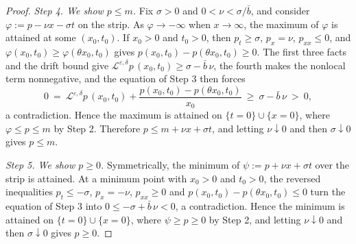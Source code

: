 \documentclass[12pt]{amsart}
\numberwithin{equation}{section}
\theoremstyle{plain}
\theoremstyle{definition}
\newcommand{\eps}{\varepsilon}
\newcommand{\Lop}{\mathcal{L}}
\begin{document}
\begin{proof}
	\emph{Step 4. We show $p\le m$.}
	Fix $\sigma>0$ and $0<\nu<\sigma/\bar b$, and consider
	$\varphi:=p-\nu x-\sigma t$ on the strip. As $\varphi\to-\infty$ when
	$x\to\infty$, the maximum of $\varphi$ is attained at some $(x_0,t_0)$. If
	$x_0>0$ and $t_0>0$, then $p_t\ge\sigma$, $p_x=\nu$, $p_{xx}\le0$, and
	$\varphi(x_0,t_0)\ge\varphi(\theta x_0,t_0)$ gives
	$p(x_0,t_0)-p(\theta x_0,t_0)\ge0$. The first three facts and the drift
	bound give $\Lop^{\eps,\delta}p\,(x_0,t_0)\ge\sigma-\bar b\,\nu$, the fourth
	makes the nonlocal term nonnegative, and the equation of Step 3 then forces
	\[
		0\ =\ \Lop^{\eps,\delta}p\,(x_0,t_0)
		+\frac{p(x_0,t_0)-p(\theta x_0,t_0)}{x_0}
		\ \ge\ \sigma-\bar b\,\nu\ >\ 0,
	\]
	a contradiction. Hence the maximum is attained
	on $\{t=0\}\cup\{x=0\}$, where $\varphi\le p\le m$ by Step 2. Therefore
	$p\le m+\nu x+\sigma t$, and letting $\nu\downarrow0$ and then
	$\sigma\downarrow0$ gives $p\le m$.

	\emph{Step 5. We show $p\ge0$.}
	Symmetrically, the minimum of $\psi:=p+\nu x+\sigma t$ over the strip is
	attained. At a minimum point with $x_0>0$ and $t_0>0$, the reversed
	inequalities $p_t\le-\sigma$, $p_x=-\nu$, $p_{xx}\ge0$ and
	$p(x_0,t_0)-p(\theta x_0,t_0)\le0$ turn the equation of Step 3 into
	$0\le-\sigma+\bar b\,\nu<0$, a contradiction. Hence the minimum is attained
	on $\{t=0\}\cup\{x=0\}$, where $\psi\ge p\ge0$ by Step 2, and letting
	$\nu\downarrow0$ and then $\sigma\downarrow0$ gives $p\ge0$.
\end{proof}
\end{document}

